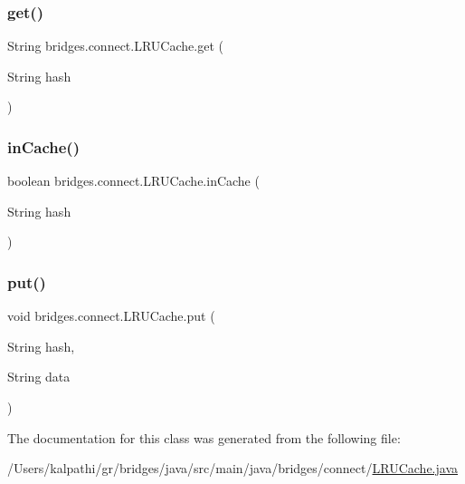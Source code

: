 \subsubsection{\texorpdfstring{get()}{get()}}
{\footnotesize\ttfamily String bridges.\+connect.\+L\+R\+U\+Cache.\+get (\begin{DoxyParamCaption}\item[{String}]{hash }\end{DoxyParamCaption})}

\mbox{\label{classbridges_1_1connect_1_1_l_r_u_cache_a5938ded50f8bd542d962c5c23323f642}} 
\subsubsection{\texorpdfstring{inCache()}{inCache()}}
{\footnotesize\ttfamily boolean bridges.\+connect.\+L\+R\+U\+Cache.\+in\+Cache (\begin{DoxyParamCaption}\item[{String}]{hash }\end{DoxyParamCaption})}

\mbox{\label{classbridges_1_1connect_1_1_l_r_u_cache_adfffe429c76956850b1038e372eec2eb}} 
\subsubsection{\texorpdfstring{put()}{put()}}
{\footnotesize\ttfamily void bridges.\+connect.\+L\+R\+U\+Cache.\+put (\begin{DoxyParamCaption}\item[{String}]{hash,  }\item[{String}]{data }\end{DoxyParamCaption})}



The documentation for this class was generated from the following file\+:\begin{DoxyCompactItemize}
\item 
/\+Users/kalpathi/gr/bridges/java/src/main/java/bridges/connect/\mbox{\hyperlink{_l_r_u_cache_8java}{L\+R\+U\+Cache.\+java}}\end{DoxyCompactItemize}
